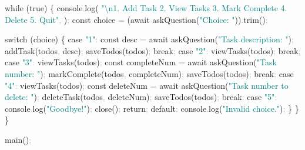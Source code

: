 \documentclass[
  justified,
  openright,
]{tufte-book}
\newcommand{\BuiltInTok}[1]{#1}
\newcommand{\ControlFlowTok}[1]{\textcolor{BrandBlue}{#1}}
\newcommand{\FunctionTok}[1]{\textcolor{BrandBlue}{#1}}
\newcommand{\KeywordTok}[1]{\textcolor{BrandBlue}{#1}}
\newcommand{\NormalTok}[1]{#1}
\newcommand{\OperatorTok}[1]{\textcolor{DarkGray}{#1}}
\newcommand{\SpecialCharTok}[1]{\textcolor{Teal}{#1}}
\newcommand{\StringTok}[1]{\textcolor{Teal}{#1}}
\newenvironment{Shaded}{%
  \begin{snugshade}
}{%
  \end{snugshade}
}
\begin{document}
\begin{Shaded}
\begin{Highlighting}[]
  \ControlFlowTok{while}\NormalTok{ (}\KeywordTok{true}\NormalTok{) \{}
    \BuiltInTok{console}\OperatorTok{.}\FunctionTok{log}\NormalTok{(}
      \StringTok{"}\SpecialCharTok{\textbackslash{}n}\StringTok{1. Add Task  2. View Tasks  3. Mark Complete  4. Delete  5. Quit"}\OperatorTok{,}
\NormalTok{    )}\OperatorTok{;}
    \KeywordTok{const}\NormalTok{ choice }\OperatorTok{=}\NormalTok{ (}\ControlFlowTok{await} \FunctionTok{askQuestion}\NormalTok{(}\StringTok{"Choice: "}\NormalTok{))}\OperatorTok{.}\FunctionTok{trim}\NormalTok{()}\OperatorTok{;}

    \ControlFlowTok{switch}\NormalTok{ (choice) \{}
      \ControlFlowTok{case} \StringTok{"1"}\OperatorTok{:}
        \KeywordTok{const}\NormalTok{ desc }\OperatorTok{=} \ControlFlowTok{await} \FunctionTok{askQuestion}\NormalTok{(}\StringTok{"Task description: "}\NormalTok{)}\OperatorTok{;}
        \FunctionTok{addTask}\NormalTok{(todos}\OperatorTok{,}\NormalTok{ desc)}\OperatorTok{;}
        \FunctionTok{saveTodos}\NormalTok{(todos)}\OperatorTok{;}
        \ControlFlowTok{break}\OperatorTok{;}
      \ControlFlowTok{case} \StringTok{"2"}\OperatorTok{:}
        \FunctionTok{viewTasks}\NormalTok{(todos)}\OperatorTok{;}
        \ControlFlowTok{break}\OperatorTok{;}
      \ControlFlowTok{case} \StringTok{"3"}\OperatorTok{:}
        \FunctionTok{viewTasks}\NormalTok{(todos)}\OperatorTok{;}
        \KeywordTok{const}\NormalTok{ completeNum }\OperatorTok{=} \ControlFlowTok{await} \FunctionTok{askQuestion}\NormalTok{(}\StringTok{"Task number: "}\NormalTok{)}\OperatorTok{;}
        \FunctionTok{markComplete}\NormalTok{(todos}\OperatorTok{,}\NormalTok{ completeNum)}\OperatorTok{;}
        \FunctionTok{saveTodos}\NormalTok{(todos)}\OperatorTok{;}
        \ControlFlowTok{break}\OperatorTok{;}
      \ControlFlowTok{case} \StringTok{"4"}\OperatorTok{:}
        \FunctionTok{viewTasks}\NormalTok{(todos)}\OperatorTok{;}
        \KeywordTok{const}\NormalTok{ deleteNum }\OperatorTok{=} \ControlFlowTok{await} \FunctionTok{askQuestion}\NormalTok{(}\StringTok{"Task number to delete: "}\NormalTok{)}\OperatorTok{;}
        \FunctionTok{deleteTask}\NormalTok{(todos}\OperatorTok{,}\NormalTok{ deleteNum)}\OperatorTok{;}
        \FunctionTok{saveTodos}\NormalTok{(todos)}\OperatorTok{;}
        \ControlFlowTok{break}\OperatorTok{;}
      \ControlFlowTok{case} \StringTok{"5"}\OperatorTok{:}
        \BuiltInTok{console}\OperatorTok{.}\FunctionTok{log}\NormalTok{(}\StringTok{"Goodbye!"}\NormalTok{)}\OperatorTok{;}
        \FunctionTok{close}\NormalTok{()}\OperatorTok{;}
        \ControlFlowTok{return}\OperatorTok{;}
      \ControlFlowTok{default}\OperatorTok{:}
        \BuiltInTok{console}\OperatorTok{.}\FunctionTok{log}\NormalTok{(}\StringTok{"Invalid choice."}\NormalTok{)}\OperatorTok{;}
\NormalTok{    \}}
\NormalTok{  \}}
\NormalTok{\}}

\FunctionTok{main}\NormalTok{()}\OperatorTok{;}
\end{Highlighting}
\end{Shaded}
\end{document}
